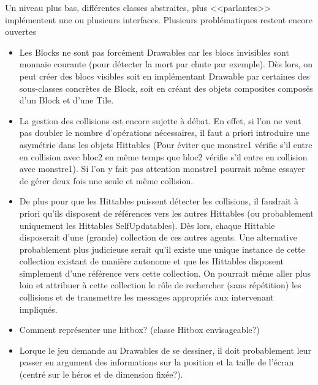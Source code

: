 \documentclass[a4paper, 12pt]{article}
\begin{document}
Un niveau plus bas, différentes classes abstraites, plus <<parlantes>> implémentent une ou plusieurs interfaces. Plusieurs problématiques restent encore ouvertes
\begin{itemize}
  \item Les Blocks ne sont pas forcément Drawables car les blocs invisibles sont monnaie courante (pour détecter la mort par chute par exemple). Dès lors, on peut créer des blocs visibles soit en implémentant Drawable par certaines des sous-classes concrètes de Block, soit en créant des objets composites composés d'un Block et d'une Tile.
  \item La gestion des collisions est encore sujette à débat. En effet, si l'on ne veut pas doubler le nombre d'opérations nécessaires, il faut a priori introduire une asymétrie dans les objets Hittables (Pour éviter que monstre1 vérifie s'il entre en collision avec bloc2 en même temps que bloc2 vérifie s'il entre en collision avec monstre1). Si l'on y fait pas attention monstre1 pourrait même essayer de gérer deux fois une seule et même collision.
  \item De plus pour que les Hittables puissent détecter les collisions, il faudrait à priori qu'ils disposent de références vers les autres Hittables (ou probablement uniquement les Hittables SelfUpdatables). Dès lors, chaque Hittable disposerait d'une (grande) collection de ces autres agents. Une alternative probablement plus judicieuse serait qu'il existe une unique instance de cette collection existant de manière autonome et que les Hittables disposent simplement d'une référence vers cette collection. On pourrait même aller plus loin et attribuer à cette collection le rôle de rechercher (sans répétition) les collisions et de transmettre les messages appropriés aux intervenant impliqués.
  \item Comment représenter une hitbox? (classe Hitbox envisageable?)
  \item Lorque le jeu demande au Drawables de se dessiner, il doit probablement leur passer en argument des informations sur la position et la taille de l'écran (centré sur le héros et de dimension fixée?).
\end{itemize}
\end{document}
